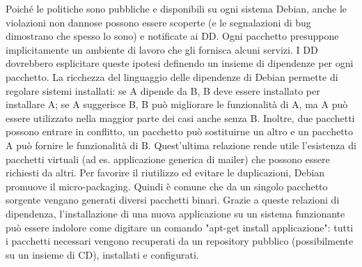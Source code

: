 \documentclass[a4paper,12pt,titlepage,oneside]{book}
\begin{document}
    Poiché le politiche sono pubbliche e disponibili su ogni sistema Debian, anche le violazioni non dannose possono essere scoperte (e le segnalazioni di bug dimostrano che spesso lo sono) e notificate ai DD.
    Ogni pacchetto presuppone implicitamente un ambiente di lavoro che gli fornisca alcuni servizi. I DD dovrebbero esplicitare queste ipotesi definendo un insieme di dipendenze per ogni pacchetto.
    La ricchezza del linguaggio delle dipendenze di Debian permette di regolare sistemi installati: se A dipende da B, B deve essere installato per
    installare A; se A suggerisce B, B può migliorare le funzionalità di A, ma A può essere utilizzato nella maggior parte dei casi anche senza B.
    Inoltre, due pacchetti possono entrare in conflitto, un pacchetto può sostituirne un altro e un pacchetto A può fornire le funzionalità di B. Quest'ultima relazione rende utile l'esistenza di pacchetti virtuali (ad es.
    applicazione generica di mailer) che possono essere richiesti da altri. Per favorire il riutilizzo ed evitare le duplicazioni, Debian promuove il micro-packaging.
    Quindi è comune che da un singolo pacchetto sorgente vengano generati diversi pacchetti binari. Grazie a queste relazioni di dipendenza, l'installazione di una nuova applicazione su un sistema funzionante può essere
    indolore come digitare un comando "apt-get install applicazione": tutti i pacchetti necessari vengono recuperati da un repository pubblico (possibilmente su un insieme di CD), installati e configurati. 
    
\end{document}
